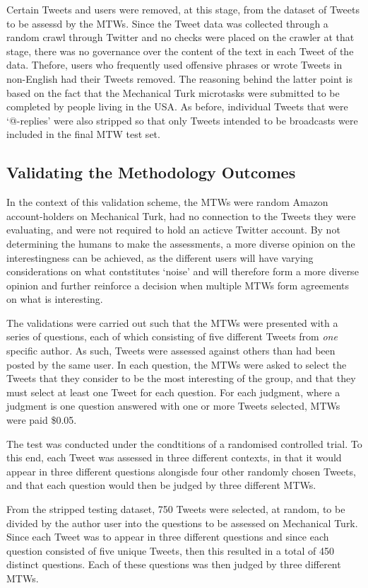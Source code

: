 Certain Tweets and users were removed, at this stage, from the dataset of Tweets to be assessd by the MTWs. Since the Tweet data was collected through a random crawl through Twitter and no checks were placed on the crawler at that stage, there was no governance over the content of the text in each Tweet of the data. Thefore, users who frequently used offensive phrases or wrote Tweets in non-English had their Tweets removed. The reasoning behind the latter point is based on the fact that the Mechanical Turk microtasks were submitted to be completed by people living in the USA. As before, individual Tweets that were `@-replies' were also stripped so that only Tweets intended to be broadcasts were included in the final MTW test set.


\subsection{Validating the Methodology Outcomes}
In the context of this validation scheme, the MTWs were random Amazon account-holders on Mechanical Turk, had no connection to the Tweets they were evaluating, and were not required to hold an acticve Twitter account. By not determining the humans to make the assessments, a more diverse opinion on the interestingness can be achieved, as the different users will have varying considerations on what contstitutes `noise' and will therefore form a more diverse opinion and further reinforce a decision when multiple MTWs form agreements on what is interesting. 

The validations were carried out such that the MTWs were presented with a series of questions, each of which consisting of five different Tweets from \textit{one} specific author. As such, Tweets were assessed against others than had been posted by the same user. In each question, the MTWs were asked to select the Tweets that they consider to be the most interesting of the group, and that they must select at least one Tweet for each question. For each judgment, where a judgment is one question answered with one or more Tweets selected, MTWs were paid \$0.05.

The test was conducted under the condtitions of a randomised controlled trial. To this end, each Tweet was assessed in three different contexts, in that it would appear in three different questions alongisde four other randomly chosen Tweets, and that each question would then be judged by three different MTWs.

From the stripped testing dataset, 750 Tweets were selected, at random, to be divided by the author user into the questions to be assessed on Mechanical Turk. Since each Tweet was to appear in three different questions and since each question consisted of five unique Tweets, then this resulted in a total of 450 distinct questions. Each of these questions was then judged by three different MTWs.


